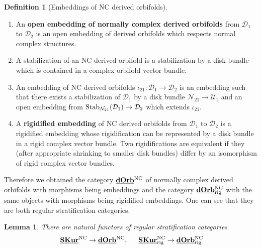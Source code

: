 \documentclass[reqno, 10pt]{amsart}
\numberwithin{equation}{section}
\numberwithin{equation}{section}
\newtheorem{lemma}[thm]{Lemma}
\theoremstyle{definition}
\newtheorem{defn}[thm]{Definition}
\theoremstyle{remark}
\newcommand{\mc}{\mathcal}
\newcommand{\uds}[1]{\underline{\smash{#1}}}
\begin{document}
\begin{defn}[Embeddings of NC derived orbifolds] \hfill
\begin{enumerate}

\item An {\bf open embedding of normally complex derived orbifolds} from ${\mc D}_1$ to ${\mc D}_2$ is an open embedding of derived orbifolds which respects normal complex structures. 

\item A stabilization of an NC derived orbifold is a stabilization by a disk bundle which is contained in a complex orbifold vector bundle.

\item An embedding of NC derived orbifolds $\iota_{21}: {\mc D}_1 \to {\mc D}_2$ is an embedding such that there exists a stabilization of ${\mc D}_1$ by a disk bundle ${\mc N}_{21} \to {\mc U}_1$ and an open embedding from ${\rm Stab}_{{\mc N}_{21}} ({\mc D}_1) \to {\mc D}_2$ which extends $\iota_{21}$. 

\item A {\bf rigidified embedding} of NC derived orbifolds from ${\mc D}_1$ to ${\mc D}_2$ is a rigidified embedding whose rigidification can be represented by a disk bundle in a rigid complex vector bundle. Two rigidifications are equivalent if they (after appropriate shrinking to smaller disk bundles) differ by an isomorphism of rigid complex vector bundles. 
\end{enumerate}
\end{defn}

Therefore we obtained the category $\uds{\bf dOrb}^{\rm NC}$ of normally complex derived orbifolds  with morphisms being embeddings and the category $\uds{\bf dOrb}^{{\rm NC}}_{\rm rig}$ with the same objects with morphisms being rigidified embeddings. One can see that they are both regular stratification categories.

\begin{lemma}
There are natural  functors of regular stratification categories
\begin{align*}
&\ \uds{\bf SKur}^{\rm NC} \to \uds{\bf dOrb}^{{\rm NC}},\ &\ \uds{\bf SKur}_{\rm rig }^{\rm NC} \to \uds{\bf dOrb}^{{\rm NC}}_{\rm rig}
\end{align*}
\end{lemma}
\end{document}
